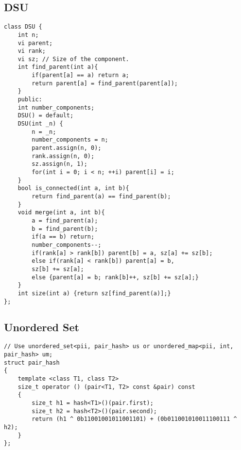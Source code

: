 \documentclass[a4paper]{article}
\begin{document}
\subsection*{DSU}
\begin{multicols}{2}
\begin{verbatim}
class DSU {
    int n;
    vi parent;
    vi rank;
    vi sz; // Size of the component.
    int find_parent(int a){
        if(parent[a] == a) return a;
        return parent[a] = find_parent(parent[a]);
    }
    public:
    int number_components;
    DSU() = default;
    DSU(int _n) {
        n = _n;
        number_components = n;
        parent.assign(n, 0);
        rank.assign(n, 0);
        sz.assign(n, 1);
        for(int i = 0; i < n; ++i) parent[i] = i;
    }
    bool is_connected(int a, int b){
        return find_parent(a) == find_parent(b);
    }
    void merge(int a, int b){
        a = find_parent(a);
        b = find_parent(b);
        if(a == b) return;
        number_components--;
        if(rank[a] > rank[b]) parent[b] = a, sz[a] += sz[b];
        else if(rank[a] < rank[b]) parent[a] = b,
        sz[b] += sz[a];
        else {parent[a] = b; rank[b]++, sz[b] += sz[a];}
    }
    int size(int a) {return sz[find_parent(a)];}
};
\end{verbatim}
\end{multicols}
\subsection*{Unordered Set}
\begin{verbatim}
// Use unordered_set<pii, pair_hash> us or unordered_map<pii, int, pair_hash> um;
struct pair_hash
{
    template <class T1, class T2>
    size_t operator () (pair<T1, T2> const &pair) const
    {
        size_t h1 = hash<T1>()(pair.first);
        size_t h2 = hash<T2>()(pair.second);
        return (h1 ^ 0b11001001011001101) + (0b011001010011100111 ^ h2);
    }
};
\end{verbatim}
\end{document}

